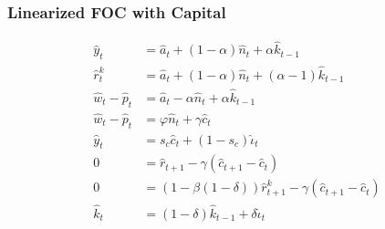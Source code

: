 \documentclass[english,xcolor=svgnames]{beamer}
\begin{document}
\begin{frame}
    \frametitle{Linearized FOC with Capital}
        \begin{align*}
			\hat{y}_t&=\hat{a}_t + (1-\alpha)\hat{n}_{t} +\alpha \hat{k}_{t-1} \\
			\hat{r}_t^k&=\hat{a}_t + (1-\alpha)\hat{n}_{t} +(\alpha-1) \hat{k}_{t-1} \\
			\hat{w}_t - \hat{p}_t &= \hat{a}_t -\alpha\hat{n}_{t} +\alpha \hat{k}_{t-1} \\
			\hat{w}_t - \hat{p}_t &=\varphi \hat{n}_t + \gamma \hat{c}_t \\
			\hat{y}_t&=s_c\hat{c}_t + (1-s_c)\hat{\iota}_t \\
			0&= \hat{r}_{t+1} -  \gamma (\hat{c}_{t+1} - \hat{c}_{t})\\
			0&= (1-\beta(1-\delta))\hat{r}_{t+1}^k -  \gamma (\hat{c}_{t+1} - \hat{c}_{t}) \\
			\hat{k}_t &= (1-\delta)\hat{k}_{t-1} + \delta\hat{\iota}_t
		\end{align*}
\end{frame}


\end{document}
